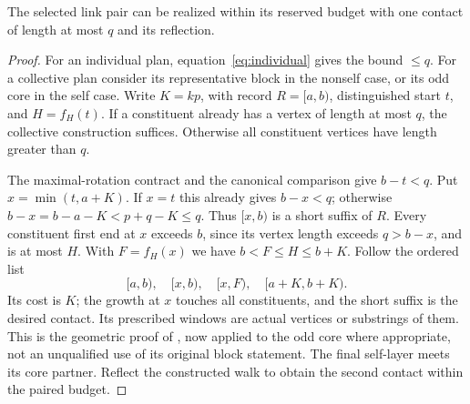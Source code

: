 \begin{lemma}\label{lem:cycle-contact}
The selected link pair can be realized within its reserved budget with
one contact of length at most $q$ and its reflection.
\end{lemma}
\begin{proof}
For an individual plan, equation~\eqref{eq:individual} gives the bound $\le q$.
For a collective plan consider its representative block in the nonself
case, or its odd core in the self case. Write $K=kp$, with record
$R=[a,b)$, distinguished start $t$, and $H=f_H(t)$.
If a constituent already has a vertex of length at most $q$, the
collective construction suffices. Otherwise all constituent vertices
have length greater than $q$.

The maximal-rotation contract and the canonical comparison give
$b-t<q$. Put $x=\min(t,a+K)$. If $x=t$ this already gives $b-x<q$;
otherwise
$b-x=b-a-K<p+q-K\le q$. Thus $[x,b)$ is a short suffix of $R$.
Every constituent first end at $x$ exceeds $b$, since its vertex length
exceeds $q>b-x$, and is at most $H$. With $F=f_H(x)$ we have
$b<F\le H\le b+K$. Follow the ordered list
\begin{equation}\label{eq:cycle-list}
[a,b),\quad[x,b),\quad[x,F),\quad[a+K,b+K).
\end{equation}
Its cost is $K$; the growth at $x$ touches all constituents, and the
short suffix is the desired contact. Its prescribed windows are actual
vertices or substrings of them. This is the geometric proof of
, now applied to the odd core where
appropriate, not an unqualified use of its original block statement.
The final self-layer meets its core partner. Reflect the constructed
walk to obtain the second contact within the paired budget.
\end{proof}


